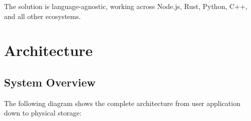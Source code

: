 \documentclass[12pt, a4paper]{article}
\begin{document}
The solution is language-agnostic, working across Node.js, Rust, Python, C++, and all other ecosystems.

\section{Architecture}
\label{sec:arch}

\subsection{System Overview}

The following diagram shows the complete architecture from user application down to physical storage:
\end{document}
